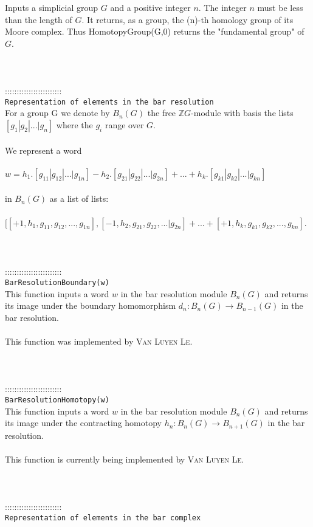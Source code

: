 \documentclass[a4paper,11pt]{report}
\begin{document}
{ Inputs a simplicial group $G$ and a positive integer $n$. The integer $n$ must be less than the length of $G$. It returns, as a group, the (n)-th homology group of its Moore complex. Thus
HomotopyGroup(G,0) returns the "fundamental group" of $G$. \\
 \\
 \\
 \\
 ::::::::::::::::::::::::\\
 \texttt{Representation of elements in the bar resolution}\\
 

 For a group G we denote by $B_n(G)$ the free $\mathbb ZG$-module with basis the lists $[g_1 | g_2 | ... | g_n]$ where the $g_i$ range over $G$. \\
 \\
 We represent a word \\
 \\
 $w = h_1.[g_{11} | g_{12} | ... | g_{1n}] - h_2.[g_{21} | g_{22} | ... |
g_{2n}] + ... + h_k.[g_{k1} | g_{k2} | ... | g_{kn}] $ \\
 \\
 in $B_n(G)$ as a list of lists: \\
 \\
 $ [ [+1,h_1,g_{11} , g_{12} , ... , g_{1n}] , [-1, h_2,g_{21} , g_{22} , ... |
g_{2n}] + ... + [+1, h_k,g_{k1} , g_{k2} , ... , g_{kn}] $. \\
 \\
 \\
 \\
 ::::::::::::::::::::::::\\
 \texttt{BarResolutionBoundary(w)}\\
 

 This function inputs a word $w$ in the bar resolution module $B_n(G)$ and returns its image under the boundary homomorphism $d_n\colon B_n(G) \rightarrow B_{n-1}(G)$ in the bar resolution. \\
 \\
 This function was implemented by \textsc{Van Luyen Le}. \\
 \\
 \\
 \\
 ::::::::::::::::::::::::\\
 \texttt{BarResolutionHomotopy(w)}\\
 

 This function inputs a word $w$ in the bar resolution module $B_n(G)$ and returns its image under the contracting homotopy $h_n\colon B_n(G) \rightarrow B_{n+1}(G)$ in the bar resolution. \\
 \\
 This function is currently being implemented by \textsc{Van Luyen Le}. \\
 \\
 \\
 \\
 ::::::::::::::::::::::::\\
 \texttt{Representation of elements in the bar complex}\\
 

}
\end{document}
